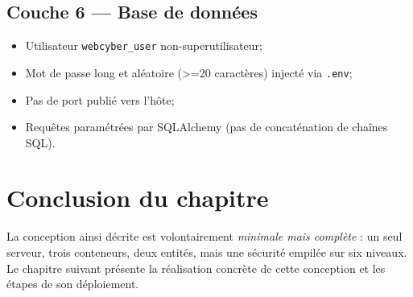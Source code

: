 \subsection{Couche 6 --- Base de données}

\begin{itemize}
  \item Utilisateur \texttt{webcyber\_user} non-superutilisateur;
  \item Mot de passe long et aléatoire (>=20 caractères) injecté via
        \texttt{.env};
  \item Pas de port publié vers l'hôte;
  \item Requêtes paramétrées par SQLAlchemy (pas de concaténation de
        chaînes SQL).
\end{itemize}

\section{Conclusion du chapitre}

La conception ainsi décrite est volontairement \emph{minimale mais
complète} : un seul serveur, trois conteneurs, deux entités, mais une
sécurité empilée sur six niveaux. Le chapitre suivant présente la
réalisation concrète de cette conception et les étapes de son
déploiement.
